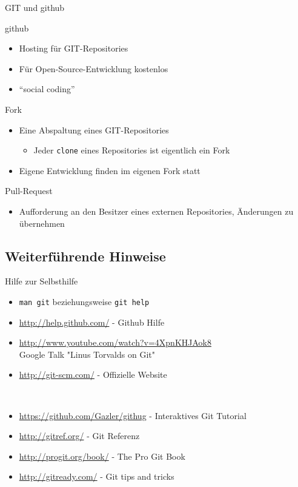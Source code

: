 \documentclass[18pt]{beamer}
\begin{document}
\begin{frame}[fragile]{GIT und github}
	\begin{block}{github}
		\begin{itemize}
			\item Hosting für GIT-Repositories
			\item Für Open-Source-Entwicklung kostenlos
			\item \enquote{social coding}
		\end{itemize}
	\end{block}
	\begin{block}{Fork}
		\begin{itemize}
			\item Eine Abspaltung eines GIT-Repositories
			\begin{itemize}
				\item Jeder \verb|clone| eines Repositories ist eigentlich ein Fork
			\end{itemize}
			\item Eigene Entwicklung finden im eigenen Fork statt
		\end{itemize}
	\end{block}
	\begin{block}{Pull-Request}
		\begin{itemize}
			\item Aufforderung an den Besitzer eines externen Repositories, Änderungen zu übernehmen
		\end{itemize}
	\end{block}
\end{frame}

\subsection{Weiterführende Hinweise}
\begin{frame}[fragile]{Hilfe zur Selbsthilfe}
	\begin{itemize}
		\item \verb|man git| beziehungsweise \verb|git help|
		\item \url{http://help.github.com/} - Github Hilfe
		\item \url{http://www.youtube.com/watch?v=4XpnKHJAok8} \\
			Google Talk "Linus Torvalds on Git"
		\item \url{http://git-scm.com/} - Offizielle Website
	\end{itemize}
\ \\

\tiny
	\begin{itemize}
		\item \url{https://github.com/Gazler/githug} - Interaktives Git Tutorial
		\item \url{http://gitref.org/} - Git Referenz
		\item \url{http://progit.org/book/} - The Pro Git Book
		\item \url{http://gitready.com/} - Git tips and tricks
	\end{itemize}
\end{frame}
\end{document}
